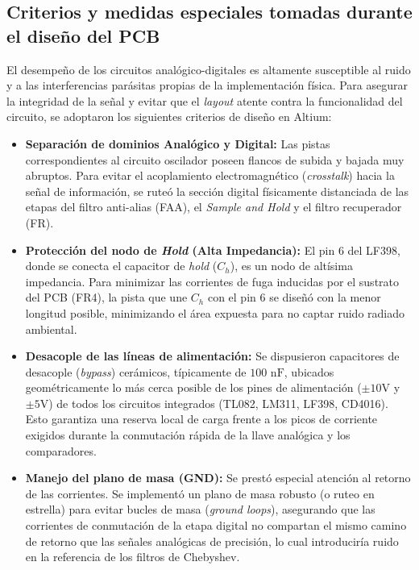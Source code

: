 \subsection{Criterios y medidas especiales tomadas durante el diseño del PCB}
El desempeño de los circuitos analógico-digitales es altamente susceptible al ruido y a las interferencias parásitas propias de la implementación física. Para asegurar la integridad de la señal y evitar que el \textit{layout} atente contra la funcionalidad del circuito, se adoptaron los siguientes criterios de diseño en Altium:

\begin{itemize}
	\item \textbf{Separación de dominios Analógico y Digital:} Las pistas correspondientes al circuito oscilador poseen flancos de subida y bajada muy abruptos. Para evitar el acoplamiento electromagnético (\textit{crosstalk}) hacia la señal de información, se ruteó la sección digital físicamente distanciada de las etapas del filtro anti-alias (FAA), el \textit{Sample and Hold} y el filtro recuperador (FR).
	
	\item \textbf{Protección del nodo de \textit{Hold} (Alta Impedancia):} El pin 6 del LF398, donde se conecta el capacitor de \textit{hold} ($C_h$), es un nodo de altísima impedancia. Para minimizar las corrientes de fuga inducidas por el sustrato del PCB (FR4), la pista que une $C_h$ con el pin 6 se diseñó con la menor longitud posible, minimizando el área expuesta para no captar ruido radiado ambiental.
	
	\item \textbf{Desacople de las líneas de alimentación:} Se dispusieron capacitores de desacople (\textit{bypass}) cerámicos, típicamente de $100\text{ nF}$, ubicados geométricamente lo más cerca posible de los pines de alimentación ($\pm10\text{V}$ y $\pm5\text{V}$) de todos los circuitos integrados (TL082, LM311, LF398, CD4016). Esto garantiza una reserva local de carga frente a los picos de corriente exigidos durante la conmutación rápida de la llave analógica y los comparadores.
	
	\item \textbf{Manejo del plano de masa (GND):} Se prestó especial atención al retorno de las corrientes. Se implementó un plano de masa robusto (o ruteo en estrella) para evitar bucles de masa (\textit{ground loops}), asegurando que las corrientes de conmutación de la etapa digital no compartan el mismo camino de retorno que las señales analógicas de precisión, lo cual introduciría ruido en la referencia de los filtros de Chebyshev.
\end{itemize}